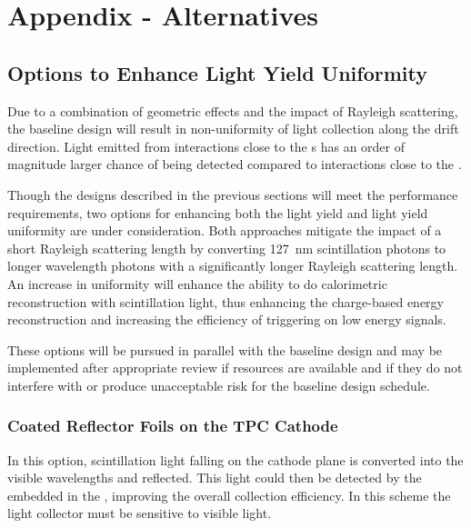 \section{Appendix - Alternatives}
\label{sec:fdsp-pd-enh}

\subsection{Options to Enhance Light Yield Uniformity}
\label{sec:fdsp-pd-enh}

Due to a combination of geometric effects and the impact of Rayleigh scattering, the baseline  design will result in non-uniformity of light collection along the drift direction. Light emitted from interactions close to the s has an order of magnitude larger chance of being detected compared to interactions close to the .    

Though the designs described in the previous sections will meet the  performance requirements, %
two options for enhancing both the light yield and light yield uniformity are under consideration.  Both approaches mitigate the impact of a short Rayleigh scattering length by converting \SI{127}{nm} scintillation photons to longer wavelength photons with a significantly longer Rayleigh scattering length. %
An increase in uniformity %
will enhance the ability to do calorimetric reconstruction with scintillation light, %
thus enhancing the charge-based energy reconstruction %
and increasing the efficiency of triggering on low energy signals.

These options will be pursued in parallel with the baseline design and may be implemented after appropriate review if resources are available and if they do not interfere with or produce unacceptable risk for the baseline design schedule.



\subsubsection{Coated Reflector Foils on the TPC Cathode}
\label{sec:fdsp-pd-enh-cathode}

In this option, scintillation light falling on the cathode plane is converted into the visible wavelengths and reflected. This light %
could then be detected by the  embedded in the , improving the overall collection efficiency. In this scheme the light collector must be sensitive to visible light. 

